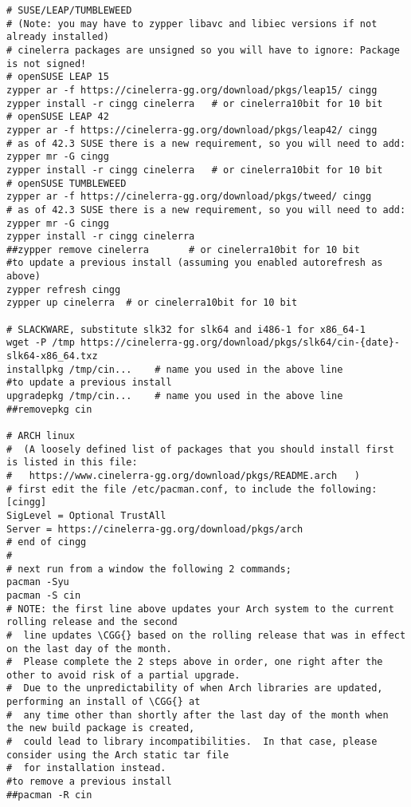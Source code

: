 {\begin{verbatim}
# SUSE/LEAP/TUMBLEWEED
# (Note: you may have to zypper libavc and libiec versions if not already installed)
# cinelerra packages are unsigned so you will have to ignore: Package is not signed!
# openSUSE LEAP 15
zypper ar -f https://cinelerra-gg.org/download/pkgs/leap15/ cingg
zypper install -r cingg cinelerra   # or cinelerra10bit for 10 bit
# openSUSE LEAP 42
zypper ar -f https://cinelerra-gg.org/download/pkgs/leap42/ cingg
# as of 42.3 SUSE there is a new requirement, so you will need to add:
zypper mr -G cingg
zypper install -r cingg cinelerra   # or cinelerra10bit for 10 bit
# openSUSE TUMBLEWEED
zypper ar -f https://cinelerra-gg.org/download/pkgs/tweed/ cingg
# as of 42.3 SUSE there is a new requirement, so you will need to add:
zypper mr -G cingg
zypper install -r cingg cinelerra
##zypper remove cinelerra	    # or cinelerra10bit for 10 bit
#to update a previous install (assuming you enabled autorefresh as above)
zypper refresh cingg
zypper up cinelerra  # or cinelerra10bit for 10 bit

# SLACKWARE, substitute slk32 for slk64 and i486-1 for x86_64-1
wget -P /tmp https://cinelerra-gg.org/download/pkgs/slk64/cin-{date}-slk64-x86_64.txz
installpkg /tmp/cin...    # name you used in the above line
#to update a previous install
upgradepkg /tmp/cin...    # name you used in the above line
##removepkg cin

# ARCH linux
#  (A loosely defined list of packages that you should install first is listed in this file:
#   https://www.cinelerra-gg.org/download/pkgs/README.arch   )
# first edit the file /etc/pacman.conf, to include the following:
[cingg]
SigLevel = Optional TrustAll
Server = https://cinelerra-gg.org/download/pkgs/arch
# end of cingg
#
# next run from a window the following 2 commands;
pacman -Syu
pacman -S cin
# NOTE: the first line above updates your Arch system to the current rolling release and the second
#  line updates \CGG{} based on the rolling release that was in effect on the last day of the month.
#  Please complete the 2 steps above in order, one right after the other to avoid risk of a partial upgrade.
#  Due to the unpredictability of when Arch libraries are updated, performing an install of \CGG{} at
#  any time other than shortly after the last day of the month when the new build package is created,
#  could lead to library incompatibilities.  In that case, please consider using the Arch static tar file
#  for installation instead.
#to remove a previous install
##pacman -R cin
\end{verbatim}
}

